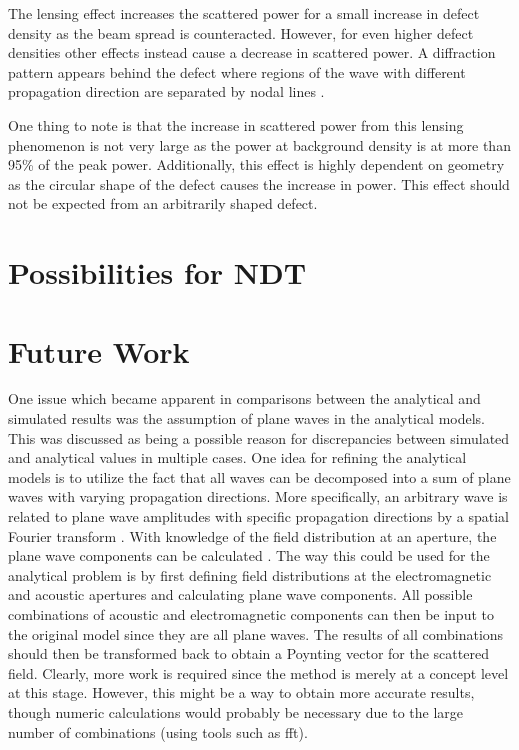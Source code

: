 \documentclass[11pt,twoside]{eitExjobb}
\begin{document}
	The lensing effect increases the scattered power for a small increase in defect density as the beam spread is counteracted. However, for even higher defect densities other effects instead cause a decrease in scattered power. A diffraction pattern appears behind the defect where regions of the wave with different propagation direction are separated by nodal lines .
	
	One thing to note is that the increase in scattered power from this lensing phenomenon is not very large as the power at background density is at more than 95\% of the peak power. Additionally, this effect is highly dependent on geometry as the circular shape of the defect causes the increase in power. This effect should not be expected from an arbitrarily shaped defect. 
	
%			
	
	\section{Possibilities for NDT}
	
	\section{Future Work}	
	One issue which became apparent in comparisons between the analytical and simulated results was the assumption of plane waves in the analytical models. This was discussed as being a possible reason for discrepancies between simulated and analytical values in multiple cases. One idea for refining the analytical models is to utilize the fact that all waves can be decomposed into a sum of plane waves with varying propagation directions. More specifically, an arbitrary wave is related to plane wave amplitudes with specific propagation directions by a spatial Fourier transform . With knowledge of the field distribution at an aperture, the plane wave components can be calculated \cite{Orfanidis2016}. The way this could be used for the analytical problem is by first defining field distributions at the electromagnetic and acoustic apertures and calculating plane wave components. All possible combinations of acoustic and electromagnetic components can then be input to the original model since they are all plane waves. The results of all combinations should then be transformed back to obtain a Poynting vector for the scattered field. Clearly, more work is required since the method is merely at a concept level at this stage. However, this might be a way to obtain more accurate results, though numeric calculations would probably be necessary due to the large number of combinations (using tools such as fft).
	
\end{document}
